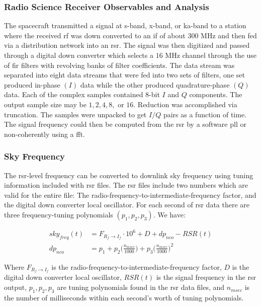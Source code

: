 \documentclass{article}
\theoremstyle{mystyle}
\begin{document}
\subsubsection{Radio Science Receiver Observables and Analysis}

The spacecraft transmitted a signal at \gls{s-band}, \gls{x-band}, or \gls{ka-band} to a station where the received \gls{rf} was down converted to an \gls{if} of about $300$ MHz and then fed via a \gls{distribution network} into an \gls{rsr}. The signal was then digitized and passed through a digital down converter which selects a $16$ MHz channel through the use of \gls{fir} filters with revolving banks of filter coefficients. The data stream was separated into eight  data streams that were fed into two sets of filters, one set produced \gls{in-phase} $(I)$ data while the other produced \gls{quadrature-phase} $(Q)$ data. Each of the complex samples contained $8$-bit $I$ and $Q$ components. The output sample size may be $1,2,4,8,$ or $16$. Reduction was accomplished via \gls{truncation}. The samples were unpacked to get $I/Q$ pairs as a function of time. The signal \gls{frequency} could then be computed from the \gls{rsr} by a software \gls{pll} or non-coherently using a \gls{fft}. 

\subsubsection{\footnotesize Sky Frequency}

The \gls{rsr}-level \gls{frequency} can be converted to \gls{downlink} \gls{sky frequency} using tuning information included with \gls{rsr} files. The \gls{rsr} files include two numbers which are valid for the entire file: The radio-frequency-to-intermediate-frequency factor, and the digital down converter local oscillator. For each second of \gls{rsr} data there are three \glspl{frequency-tuning polynomial} $(p_{1},p_{2},p_{3})$. We have:

\begin{align}
sky_{freq}(t) &= F_{R_{f}\rightarrow I_{f}}\cdot 10^{6} + D+dp_{nco}-RSR(t) \label{equ:usr_sky_freq_t}\\
dp_{nco} &= p_1+p_2 \bigg(\frac{n_{msec}}{1000}\bigg)+p_3 \bigg(\frac{n_{msec}}{1000}\bigg)^2 \label{equ:usr_dp_nco}
\end{align}

\noindent Where $F_{R_{f}\rightarrow I_{f}}$ is the radio-frequency-to-intermediate-frequency factor, $D$ is the digital down converter local oscillator, $RSR(t)$ is the signal frequency in the \gls{rsr} output, $p_1,p_2,p_3$ are tuning polynomials found in the \gls{rsr} data files, and $n_{msec}$ is the number of milliseconds within each second's worth of tuning polynomials. 
\end{document}
